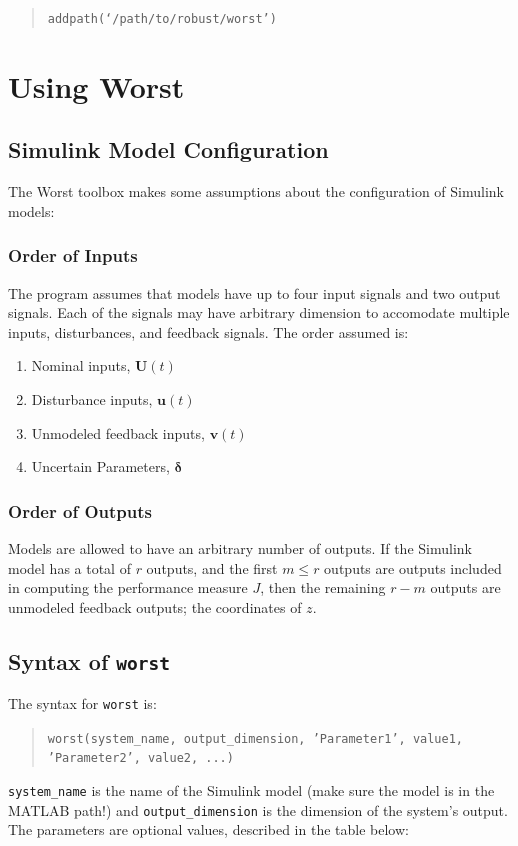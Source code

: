 \documentclass{article}
\newcommand{\ub}{\mathbf{u}}
\newcommand{\vb}{\mathbf{v}}
\newcommand{\deltab}{\bm{\delta}}
\newcommand{\Ub}{\mathbf{U}}
\begin{document}
\begin{quote}\texttt{addpath(`/path/to/robust/worst')} \end{quote}

\section{Using Worst}

\subsection{Simulink Model Configuration}
The Worst toolbox makes some assumptions about the configuration of Simulink
models:

\subsubsection*{Order of Inputs}

The program assumes that models have up to four input signals and two output
signals. Each of the signals may have arbitrary dimension to accomodate multiple
inputs, disturbances, and feedback signals. The order assumed is:
\begin{enumerate}
\item Nominal inputs, $\Ub(t)$
\item Disturbance inputs, $\ub(t)$
\item Unmodeled feedback inputs, $\vb(t)$
\item Uncertain Parameters, $\deltab$
\end{enumerate}

\subsubsection*{Order of Outputs}

Models are allowed to have an arbitrary number of outputs. If the Simulink model
has a total of $r$ outputs, and the first $m\leq r$ outputs are outputs included
in computing the performance measure $J$, then the remaining $r - m$ outputs are
unmodeled feedback outputs; the coordinates of $z$.


\subsection{Syntax of \texttt{worst}}
The syntax for \texttt{worst} is:
\begin{quote}
\texttt{worst(system\_name, output\_dimension, 'Parameter1', value1,
'Parameter2', value2, ...)}
\end{quote}
\texttt{system\_name} is the name of the Simulink model (make sure the model is
in the MATLAB path!) and \texttt{output\_dimension} is the dimension of the
system's output. The parameters are optional values, described in the table
below:
\end{document}
